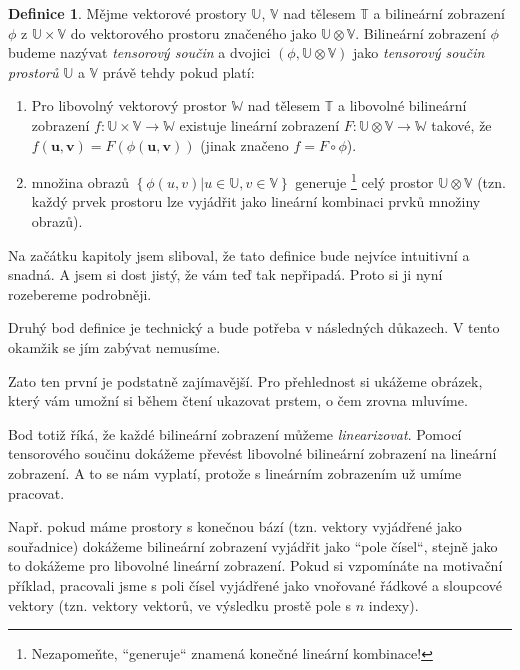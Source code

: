 \documentclass[a5paper,12pt]{amsbook}
\theoremstyle{definition}
\newtheorem{definition}{Definice}[chapter]
\newcommand{\myvec}[1]{\bm{#1}}
\newcommand{\myspace}[1]{\mathbb{#1}}
\begin{document}
\begin{definition}
\label{def:tensor_product_1}
Mějme vektorové prostory $\myspace{U}$, $\myspace{V}$ nad tělesem $\myspace{T}$ a bilineární zobrazení
$\phi$ z $\myspace{U}\times\myspace{V}$ do vektorového prostoru značeného jako
$\myspace{U}\otimes\myspace{V}$. Bilineární zobrazení $\phi$ budeme nazývat \textit{tensorový součin}
a dvojici $(\phi, \myspace{U}\otimes\myspace{V})$ jako \textit{tensorový součin prostorů} $\myspace{U}$
a $\myspace{V}$ právě tehdy pokud platí:
\begin{enumerate}	
\item Pro libovolný vektorový prostor $\myspace{W}$ nad tělesem $\myspace{T}$ a libovolné bilineární
    zobrazení $f: \myspace{U}\times\myspace{V}\rightarrow\myspace{W}$ existuje lineární zobrazení
    $F: \myspace{U}\otimes\myspace{V}\rightarrow\myspace{W}$ takové, že $f(\myvec{u}, \myvec{v})
    = F(\phi(\myvec{u}, \myvec{v}))$ (jinak značeno $f = F \circ \phi$).
\item množina obrazů $\left\lbrace\phi(u, v)|u\in\myspace{U}, v\in\myspace{V}\right\rbrace$ generuje
    \footnote{Nezapomeňte, ``generuje`` znamená konečné lineární kombinace!} celý prostor
    $\myspace{U}\otimes\myspace{V}$ (tzn. každý prvek prostoru lze vyjádřit jako lineární
    kombinaci prvků množiny obrazů).
\end{enumerate}
\end{definition}

Na začátku kapitoly jsem sliboval, že tato definice bude nejvíce intuitivní a snadná. A jsem si dost
jistý, že vám teď tak nepřipadá. Proto si ji nyní rozebereme podrobněji.

Druhý bod definice je technický a bude potřeba v následných důkazech. V tento okamžik
se jím zabývat nemusíme.

Zato ten první je podstatně zajímavější. Pro přehlednost si ukážeme obrázek, který vám umožní si během
čtení ukazovat prstem, o čem zrovna mluvíme.
\begin{center}

\end{center}

Bod totiž říká, že každé bilineární zobrazení můžeme \textit{linearizovat}. Pomocí tensorového
součinu dokážeme převést libovolné bilineární zobrazení na lineární zobrazení. A to se nám vyplatí,
protože s lineárním zobrazením už umíme pracovat.

Např. pokud máme prostory s konečnou bází (tzn. vektory vyjádřené jako souřadnice) dokážeme
bilineární zobrazení vyjádřit jako ``pole čísel``, stejně jako to dokážeme pro libovolné lineární
zobrazení. Pokud si vzpomínáte na motivační příklad, pracovali jsme s poli čísel vyjádřené jako
vnořované řádkové a sloupcové vektory (tzn. vektory vektorů, ve výsledku prostě pole s $n$ indexy).
\end{document}
